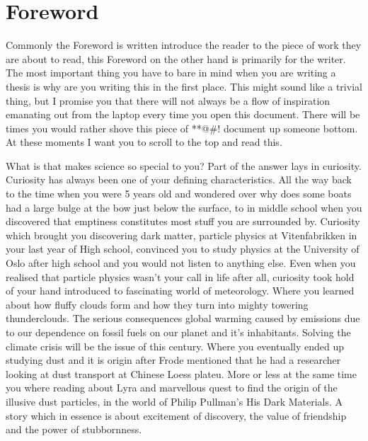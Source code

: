 \chapter*{Foreword}
Commonly the Foreword is written introduce the reader to the piece of work they are about to read, this Foreword on the other hand is primarily for the writer. The most important thing you have to bare in mind when you are writing a thesis is why are you writing this in the first place. This might sound like a trivial thing, but I promise you that there will not always be a flow of inspiration emanating out from the laptop every time you open this document. There will be times you would rather shove this piece of **@\#! document up someone bottom. At these moments I want you to scroll to the top and read this.

What is that makes science so special to you? Part of the answer lays in curiosity. Curiosity has always been one of your defining characteristics. All the way back to the time when you were 5 years old and wondered over why does some boats had a large bulge at the bow just below the surface, to in middle school when you discovered that emptiness constitutes most stuff you are surrounded by. Curiosity which brought you discovering dark matter, particle physics at Vitenfabrikken in your last year of High school, convinced you to study physics at the University of Oslo after high school and you would not listen to anything else. Even when you realised that particle physics wasn't your call in life after all, curiosity took hold of your hand introduced to fascinating world of meteorology. Where you learned about how fluffy clouds form and how they turn into mighty towering thunderclouds. The serious consequences global warming caused by  emissions due to our dependence on fossil fuels on our planet and it's inhabitants. Solving the climate crisis will be the issue of this century. Where you eventually ended up studying dust and it is origin after Frode mentioned that he had a researcher looking at dust transport at Chinese Loess plateu. More or less at the same time you where reading about Lyra and marvellous quest to find the origin of the illusive dust particles, in the world of Philip Pullman's His Dark Materials. A story which in essence is about excitement of discovery, the value of friendship and the power of stubbornness.     